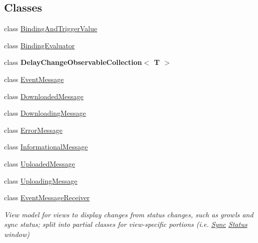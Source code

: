 \subsection*{Classes}
\begin{DoxyCompactItemize}
\item 
class \hyperlink{class_cloud_api_public_1_1_event_message_receiver_1_1_binding_and_trigger_value}{Binding\-And\-Trigger\-Value}
\item 
class \hyperlink{class_cloud_api_public_1_1_event_message_receiver_1_1_binding_evaluator}{Binding\-Evaluator}
\item 
class {\bfseries Delay\-Change\-Observable\-Collection$<$ T $>$}
\item 
class \hyperlink{class_cloud_api_public_1_1_event_message_receiver_1_1_event_message}{Event\-Message}
\item 
class \hyperlink{class_cloud_api_public_1_1_event_message_receiver_1_1_downloaded_message}{Downloaded\-Message}
\item 
class \hyperlink{class_cloud_api_public_1_1_event_message_receiver_1_1_downloading_message}{Downloading\-Message}
\item 
class \hyperlink{class_cloud_api_public_1_1_event_message_receiver_1_1_error_message}{Error\-Message}
\item 
class \hyperlink{class_cloud_api_public_1_1_event_message_receiver_1_1_informational_message}{Informational\-Message}
\item 
class \hyperlink{class_cloud_api_public_1_1_event_message_receiver_1_1_uploaded_message}{Uploaded\-Message}
\item 
class \hyperlink{class_cloud_api_public_1_1_event_message_receiver_1_1_uploading_message}{Uploading\-Message}
\item 
class \hyperlink{class_cloud_api_public_1_1_event_message_receiver_1_1_event_message_receiver}{Event\-Message\-Receiver}
\begin{DoxyCompactList}\small\item\em View model for views to display changes from status changes, such as growls and sync status; split into partial classes for view-\/specific portions (i.\-e. \hyperlink{namespace_cloud_api_public_1_1_sync}{Sync} \hyperlink{namespace_cloud_api_public_1_1_event_message_receiver_1_1_status}{Status} window) \end{DoxyCompactList}\end{DoxyCompactItemize}
